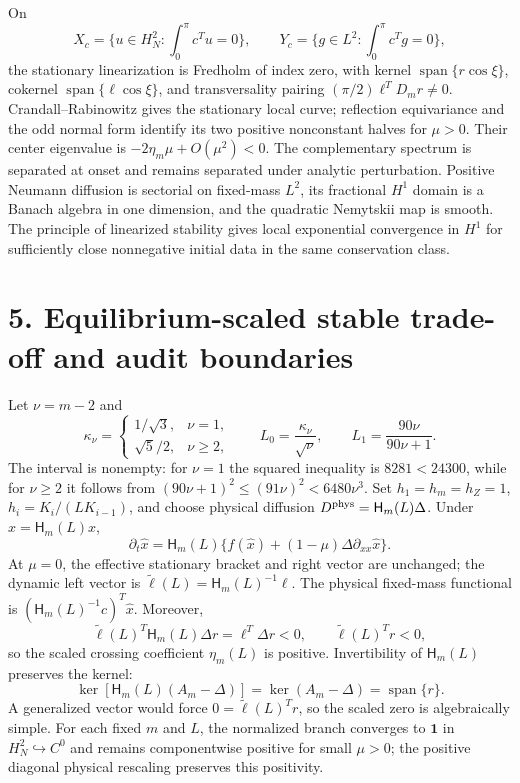 \documentclass[10pt]{article}
\begin{document}
On
\[
 X_c=\{u\in H_N^2:\textstyle\int_0^\pi c^Tu=0\},\qquad
 Y_c=\{g\in L^2:\textstyle\int_0^\pi c^Tg=0\},
\]
the stationary linearization is Fredholm of index zero, with kernel
$\operatorname{span}\{r\cos\xi\}$, cokernel
$\operatorname{span}\{\ell\cos\xi\}$, and transversality pairing
$(\pi/2)\ell^TD_mr\ne0$.  Crandall--Rabinowitz gives the stationary local curve; reflection equivariance
and the odd normal form identify its two positive nonconstant halves for
$\mu>0$. Their center eigenvalue is $-2\eta_m\mu+O(\mu^2)<0$. The complementary spectrum is separated at onset and remains separated under analytic perturbation. Positive Neumann diffusion is sectorial on fixed-mass $L^2$, its fractional $H^1$ domain is a Banach algebra in one dimension, and the quadratic Nemytskii map is smooth. The principle of linearized stability gives local exponential convergence in $H^1$ for sufficiently close nonnegative initial data in the same conservation class.

\newpage
\section*{5. Equilibrium-scaled stable trade-off and audit boundaries}
Let $\nu=m-2$ and
\[
 \kappa_\nu=\begin{cases}1/\sqrt3,&\nu=1,\\
 \sqrt5/2,&\nu\ge2,
 \end{cases}
 \qquad L_0=\frac{\kappa_\nu}{\sqrt\nu},
 \qquad L_1=\frac{90\nu}{90\nu+1}.
\]
The interval is nonempty: for $\nu=1$ the squared inequality is
$8281<24300$, while for $\nu\ge2$ it follows from
$(90\nu+1)^2\le(91\nu)^2<6480\nu^3$.  Set $h_1=h_m=h_Z=1$,
$h_i=K_i/(LK_{i-1})$, and choose physical diffusion
$D^{\rm phys}=\mathsf H_m(L)\Delta$. Under
$\widehat x=\mathsf H_m(L)x$,
\[
\partial_t\widehat x=\mathsf H_m(L)
\{f(\widehat x)+(1-\mu)\Delta\partial_{xx}\widehat x\}.
\]
At $\mu=0$, the effective stationary bracket and right vector are unchanged; the dynamic
left vector is $\widetilde\ell(L)=\mathsf H_m(L)^{-1}\ell$. The physical
fixed-mass functional is $(\mathsf H_m(L)^{-1}c)^T\widehat x$.
Moreover,
\[
\widetilde\ell(L)^T\mathsf H_m(L)\Delta r
=\ell^T\Delta r<0,
\qquad \widetilde\ell(L)^Tr<0,
\]
so the scaled crossing coefficient $\eta_m(L)$ is positive.
Invertibility of $\mathsf H_m(L)$ preserves the kernel:
\[
 \ker[\mathsf H_m(L)(A_m-\Delta)]
 =\ker(A_m-\Delta)=\operatorname{span}\{r\}.
\]
A generalized vector would force $0=\widetilde\ell(L)^Tr$, so the scaled
zero is algebraically simple.
For each fixed $m$ and $L$, the normalized branch converges to $\mathbf1$ in
$H_N^2\hookrightarrow C^0$ and remains componentwise positive for small
$\mu>0$; the positive diagonal physical rescaling preserves this positivity.
\end{document}
